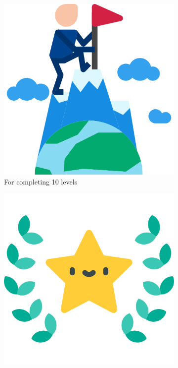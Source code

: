 \documentclass[12 pct]{report}
\begin{document}
\begin{figure}[H]
\begin{subfigure}[b]{0.3\linewidth}
  \end{subfigure}
  \begin{subfigure}[b]{0.3\linewidth}
    \includegraphics[width=\linewidth]{ArRobotCodeAchiv2}
    \caption{For completing 10 levels}
  \end{subfigure}
  \begin{subfigure}[b]{0.3\linewidth}
    \includegraphics[width=\linewidth]{ArRobotCodeAchiv3}

\end{subfigure}
\end{figure}
\end{document}
